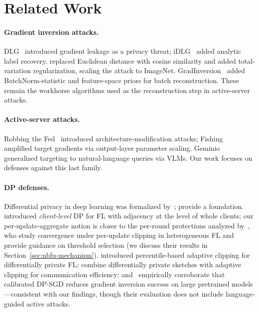 \documentclass[11pt]{article}
\begin{document}
\section{Related Work}

\paragraph{Gradient inversion attacks.}
DLG~\citep{dlg2019} introduced gradient leakage as a privacy threat; iDLG~\citep{idlg2020} added analytic label recovery. \citet{ig2020} replaced Euclidean distance with cosine similarity and added total-variation regularization, scaling the attack to ImageNet. GradInversion~\citep{gradinversion2021} added BatchNorm-statistic and feature-space priors for batch reconstruction. These remain the workhorse algorithms used as the reconstruction step in active-server attacks.

\paragraph{Active-server attacks.}
Robbing the Fed~\citep{robbing2022} introduced architecture-modification attacks; Fishing~\citep{fishing2023} amplified target gradients via output-layer parameter scaling. Geminio~\citep{geminio2024} generalized targeting to natural-language queries via VLMs. Our work focuses on defenses against this last family.

\paragraph{DP defenses.}
Differential privacy in deep learning was formalized by~\citet{dpsgd2016}; \citet{differentialprivacy2014} provide a foundation. \citet{mcmahan2018learning} introduced \emph{client-level} DP for FL with adjacency at the level of whole clients; our per-update-aggregate notion is closer to the per-round protections analyzed by~\citet{zhang2021clipping}, who study convergence under per-update clipping in heterogeneous FL and provide guidance on threshold selection (we discuss their results in Section~\ref{sec:nbfu-mechanism}). \citet{andrew2021adaptive} introduced percentile-based adaptive clipping for differentially private FL; \citet{dpsfl2024} combine differentially private sketches with adaptive clipping for communication efficiency; and~\citet{dp_gia_eval2025} empirically corroborate that calibrated DP-SGD reduces gradient inversion success on large pretrained models---consistent with our findings, though their evaluation does not include language-guided active attacks.
\end{document}
